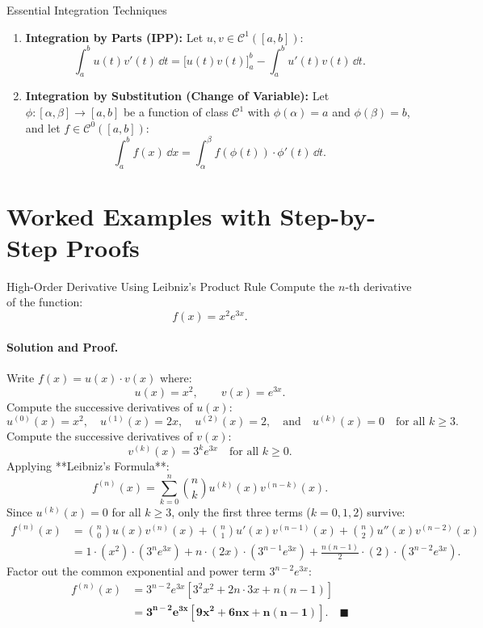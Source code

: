 \begin{propbox}{Essential Integration Techniques}
\begin{enumerate}[leftmargin=1.4em,itemsep=3pt]
  \item \textbf{Integration by Parts (IPP):}
  Let $u, v \in \mathcal{C}^1([a, b])$:
  \begin{equation}
  \int_a^b u(t) v'(t)\,\dd t = \big[ u(t) v(t) \big]_a^b - \int_a^b u'(t) v(t)\,\dd t.
  \end{equation}
  \item \textbf{Integration by Substitution (Change of Variable):}
  Let $\phi: [\alpha, \beta] \longrightarrow [a, b]$ be a function of class $\mathcal{C}^1$ with $\phi(\alpha) = a$ and $\phi(\beta) = b$, and let $f \in \mathcal{C}^0([a, b])$:
  \begin{equation}
  \int_a^b f(x)\,\dd x = \int_\alpha^\beta f(\phi(t)) \cdot \phi'(t)\,\dd t.
  \end{equation}
\end{enumerate}
\end{propbox}

\section{Worked Examples with Step-by-Step Proofs}

\begin{workedexample}{High-Order Derivative Using Leibniz's Product Rule}
Compute the $n$-th derivative of the function:
\[
f(x) = x^2 e^{3x}.
\]

\paragraph{Solution and Proof.}
Write $f(x) = u(x) \cdot v(x)$ where:
\[
u(x) = x^2, \qquad v(x) = e^{3x}.
\]
Compute the successive derivatives of $u(x)$:
\[
u^{(0)}(x) = x^2, \quad u^{(1)}(x) = 2x, \quad u^{(2)}(x) = 2, \quad \text{and} \quad u^{(k)}(x) = 0 \quad \text{for all } k \ge 3.
\]
Compute the successive derivatives of $v(x)$:
\[
v^{(k)}(x) = 3^k e^{3x} \quad \text{for all } k \ge 0.
\]
Applying **Leibniz's Formula**:
\[
f^{(n)}(x) = \sum_{k=0}^n \binom{n}{k} u^{(k)}(x) v^{(n-k)}(x).
\]
Since $u^{(k)}(x) = 0$ for all $k \ge 3$, only the first three terms ($k = 0, 1, 2$) survive:
\begin{align*}
f^{(n)}(x) &= \binom{n}{0} u(x) v^{(n)}(x) + \binom{n}{1} u'(x) v^{(n-1)}(x) + \binom{n}{2} u''(x) v^{(n-2)}(x) \\
           &= 1 \cdot (x^2) \cdot \left( 3^n e^{3x} \right) + n \cdot (2x) \cdot \left( 3^{n-1} e^{3x} \right) + \frac{n(n-1)}{2} \cdot (2) \cdot \left( 3^{n-2} e^{3x} \right).
\end{align*}
Factor out the common exponential and power term $3^{n-2} e^{3x}$:
\begin{align*}
f^{(n)}(x) &= 3^{n-2} e^{3x} \left[ 3^2 x^2 + 2n \cdot 3 x + n(n-1) \right] \\
           &= \mathbf{3^{n-2} e^{3x} \left[ 9x^2 + 6nx + n(n-1) \right]}. \quad \blacksquare
\end{align*}
\end{workedexample}


